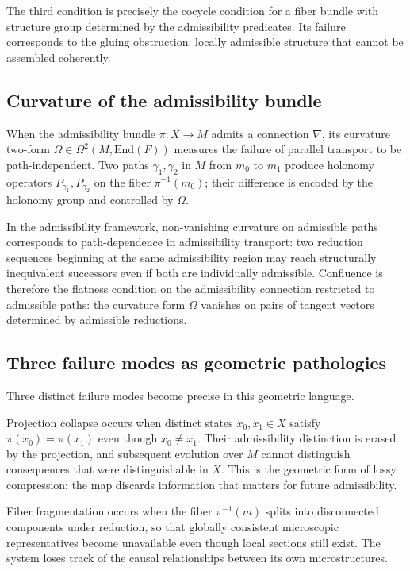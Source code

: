 \documentclass[12pt, a4paper]{article}
\theoremstyle{plain}
\theoremstyle{definition}
\theoremstyle{remark}
\begin{document}
The third condition is precisely the cocycle condition for a fiber bundle with structure
group determined by the admissibility predicates. Its failure corresponds to the gluing
obstruction: locally admissible structure that cannot be assembled coherently.

\subsection{Curvature of the admissibility bundle}

When the admissibility bundle $\pi : X \to M$ admits a connection $\nabla$, its
curvature two-form $\Omega \in \Omega^2(M, \mathrm{End}(F))$ measures the failure of
parallel transport to be path-independent. Two paths $\gamma_1, \gamma_2$ in $M$ from
$m_0$ to $m_1$ produce holonomy operators $P_{\gamma_1}, P_{\gamma_2}$ on the fiber
$\pi^{-1}(m_0)$; their difference is encoded by the holonomy group and controlled by
$\Omega$.

In the admissibility framework, non-vanishing curvature on admissible paths corresponds
to path-dependence in admissibility transport: two reduction sequences beginning at the
same admissibility region may reach structurally inequivalent successors even if both
are individually admissible. Confluence is therefore the flatness condition on the
admissibility connection restricted to admissible paths: the curvature form $\Omega$
vanishes on pairs of tangent vectors determined by admissible reductions.

\subsection{Three failure modes as geometric pathologies}

Three distinct failure modes become precise in this geometric language.

Projection collapse occurs when distinct states $x_0, x_1 \in X$ satisfy
$\pi(x_0) = \pi(x_1)$ even though $x_0 \neq x_1$. Their admissibility distinction
is erased by the projection, and subsequent evolution over $M$ cannot distinguish
consequences that were distinguishable in $X$. This is the geometric form of lossy
compression: the map discards information that matters for future admissibility.

Fiber fragmentation occurs when the fiber $\pi^{-1}(m)$ splits into disconnected
components under reduction, so that globally consistent microscopic representatives
become unavailable even though local sections still exist. The system loses track
of the causal relationships between its own microstructures.
\end{document}
